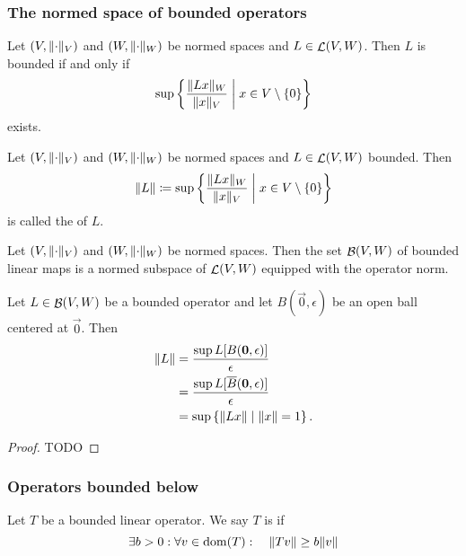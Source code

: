\subsubsection{The normed space of bounded operators}
\begin{lemma} \label{existenceOperatorNorm}
Let $(V,\lVert\cdot\rVert_V)$ and $(W,\lVert\cdot\rVert_W)$ be normed spaces and $L\in\mathop{\mathcal{L}}(V, W)$. Then $L$ is bounded \textup{if and only if}
\[ \sup\left\{ \frac{\lVert Lx\rVert_W}{\lVert x\rVert_V} \;\middle|\; x\in V\setminus\{0\} \right\} \] 
exists.
\end{lemma}
\begin{definition}
Let $(V,\lVert\cdot\rVert_V)$ and $(W,\lVert\cdot\rVert_W)$ be normed spaces and $L\in\mathop{\mathcal{L}}(V, W)$ bounded. Then
\[ \lVert L\rVert \coloneqq \sup\left\{ \frac{\lVert Lx\rVert_W}{\lVert x\rVert_V} \;\middle|\; x\in V\setminus\{0\} \right\} \]
is called the  of $L$.
\end{definition}

\begin{proposition} \label{BoundedSpace}
Let $(V,\lVert\cdot\rVert_V)$ and $(W,\lVert\cdot\rVert_W)$ be normed spaces. Then the set $\mathop{\mathcal{B}}(V,W)$ of bounded linear maps is a normed subspace of $\mathop{\mathcal{L}}(V,W)$ equipped with the operator norm.
\end{proposition}

\begin{proposition} \label{operatorNorm}
Let $L\in\mathop{\mathcal{B}}(V,W)$ be a bounded operator and let $B(\vec{0},\epsilon)$ be an open ball centered at $\vec{0}$. Then
\begin{align*}
\lVert L\rVert &= \frac{\sup L[B(\boldsymbol{\mathrm{0}},\epsilon)]}{\epsilon} \\
&= \frac{\sup L[\overline{B}(\boldsymbol{\mathrm{0}},\epsilon)]}{\epsilon} \\
&= \sup\left\{ \lVert Lx\rVert \;\middle|\; \lVert x\rVert = 1 \right\}.
\end{align*}
\end{proposition}
\begin{proof}
TODO
\end{proof}

\subsubsection{Operators bounded below}
\begin{definition}
Let $T$ be a bounded linear operator. We say $T$ is  if
\[ \exists b>0:\forall v\in \operatorname{dom}(T): \quad \lVert Tv\rVert\geq b\lVert v\rVert \]
\end{definition}

